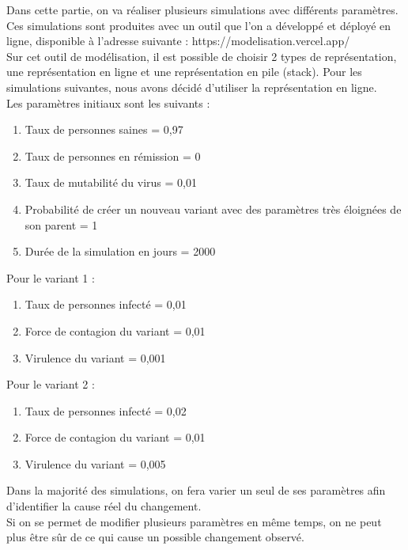 \documentclass{article}
\begin{document}
Dans cette partie, on va réaliser plusieurs simulations avec différents paramètres. Ces simulations sont produites avec un outil que l'on a développé et déployé en ligne, disponible à l'adresse suivante : https://modelisation.vercel.app/ \\
Sur cet outil de modélisation, il est possible de choisir 2 types de représentation, une représentation en ligne et une représentation en pile (stack). Pour les simulations suivantes, nous avons décidé d'utiliser la représentation en ligne. \\
Les paramètres initiaux sont les suivants : \\
\begin{enumerate}
    \item Taux de personnes saines = 0,97
    \item Taux de personnes en rémission = 0
    \item Taux de mutabilité du virus = 0,01
    \item Probabilité de créer un nouveau variant avec des paramètres très éloignées de son parent = 1
    \item Durée de la simulation en jours = 2000 \\
\end{enumerate}
Pour le variant 1 :
\begin{enumerate}
    \item Taux de personnes infecté = 0,01
    \item Force de contagion du variant = 0,01
    \item Virulence du variant = 0,001\\
\end{enumerate}
Pour le variant 2 :
\begin{enumerate}
    \item Taux de personnes infecté = 0,02
    \item Force de contagion du variant = 0,01
    \item Virulence du variant = 0,005\\
\end{enumerate}

Dans la majorité des simulations, on fera varier un seul de ses paramètres afin d'identifier la cause réel du changement. \\
Si on se permet de modifier plusieurs paramètres en même temps, on ne peut plus être sûr de ce qui cause un possible changement observé. \\
\end{document}
